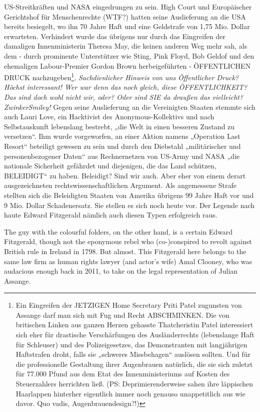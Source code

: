 \begin{multicols}{2}
{US-Streitkräften und NASA eingedrungen zu sein. High
Court und Europäischer Gerichtshof für Menschenrechte (WTF?) hatten seine Auslieferung an die USA bereits
besiegelt, wo ihn 70 Jahre Haft und eine Geldstrafe von
1,75 Mio. Dollar erwarteten. Verhindert wurde das übrigens nur durch das Eingreifen der damaligen Innenministerin Theresa May, die keinen anderen Weg mehr sah,
als dem - durch prominente Unterstützer wie Sting, Pink
Floyd, Bob Geldof und den ehemaligen Labour-Premier Gordon Brown herbeigeführten - ÖFFENTLICHEN
DRUCK nachzugeben\footnote[13]{Ein Eingreifen der JETZIGEN Home Secretary Priti Patel zugunsten von Assange darf man sich mit Fug und
Recht ABSCHMINKEN. Die von britischen Linken aus ganzen Herzen gehasste Thatcheristin Patel interessiert
sich eher für drastische Verschärfungen des Ausländerrechts (lebenslange Haft für Schleuser) und des Polizeigesetzes, das Demonstranten mit langjährigen Haftstrafen droht, falls sie „schweres Missbehagen“ auslösen
sollten. Und für die professionelle Gestaltung ihrer Augenbrauen natürlich, die sie sich zuletzt für 77.000 Pfund
aus dem Etat des Innenministeriums auf Kosten des Steuerzahlers herrichten ließ.
(PS: Deprimierenderweise sahen ihre läppischen Haarlappen hinterher eigentlich immer noch genauso unappetitlich aus wie davor. Quo vadis, Augenbrauendesign?!)}.
\textCR
\textit{Sachdienlicher Hinweis von uns
Öffentlicher Druck? Höchst interessant! Wer war denn
das noch gleich, diese ÖFFENTLICHKEIT? Das sind doch
wohl nicht wir, oder? Oder sind SIE da draußen das vielleicht? ZwinkerSmiley!}
\textCR
Gegen seine Auslieferung an die Vereinigten Staaten
stemmte sich auch Lauri Love, ein Hacktivist des Anonymous-Kollektivs und nach Selbstauskunft lebenslang
bestrebt, „die Welt in einen besseren Zustand zu versetzen“. Ihm wurde vorgeworfen, an einer Aktion namens
„Operation Last Resort“ beteiligt gewesen zu sein und
durch den Diebstahl „militärischer und personenbezogener Daten“ aus Rechnernetzen von US-Army und
NASA „die nationale Sicherheit gefährdet und diejenigen, die das Land schützen, BELEIDIGT“ zu haben. Beleidigt? Sind wir auch. Aber eher von einem derart ausgezeichneten rechtswissenschaftlichen Argument. Als
angemessene Strafe stellten sich die Beleidigten Staaten
von Amerika übrigens 99 Jahre Haft vor und 9 Mio. Dollar Schadenersatz.
\textCR
Sie stellen es sich noch heute vor. Der Legende nach
haute Edward Fitzgerald nämlich auch diesen Typen erfolgreich raus.}


The guy with the colourful folders, on the other hand, is a certain Edward Fitzgerald, though not the eponymous rebel who (co-)conspired to revolt against British rule in Ireland in 1798. But
almost. This Fitzgerald here belongs to the same law firm
as human rights lawyer (and actor's wife) Amal Clooney, who was audacious enough back in 2011,
to take on the legal representation of Julian Assange.


\end{multicols}
